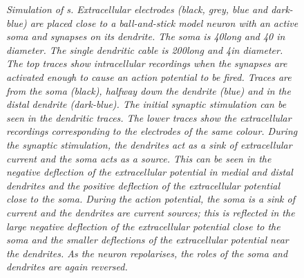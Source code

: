 \begin{figure}[t]
  \caption{\emph{Simulation of s. Extracellular
    electrodes (black, grey, blue and dark-blue) are placed
    close to a ball-and-stick model neuron with an active soma and
    synapses on its dendrite. The soma is 40\uum long and 40\uum
    in diameter. The single dendritic cable is 200\uum long and 4\uum in
    diameter. The top traces show intracellular recordings when the
    synapses are activated enough to cause an action potential to be
    fired.  Traces are from the soma (black), halfway down the
    dendrite (blue) and in the distal dendrite (dark-blue).
    The initial synaptic stimulation can be seen in the dendritic
    traces. The lower traces show the extracellular recordings
    corresponding to the electrodes of the same colour.  During the
    synaptic stimulation, the dendrites act as a sink of extracellular
    current and the soma acts as a source. This can be seen in the
    negative deflection of the extracellular potential in medial and
    distal dendrites and the positive deflection of the extracellular
    potential close to the soma. During the action potential, the soma
    is a sink of current and the dendrites are current sources; this
    is reflected in the large negative deflection of the extracellular
    potential close to the soma and the smaller deflections of the
    extracellular potential near the dendrites. As the neuron
    repolarises, the roles of the soma and dendrites are again
    reversed.} 
        }
  \figpermOurs
  \label{mm:fig:extracellular}
\end{figure}

